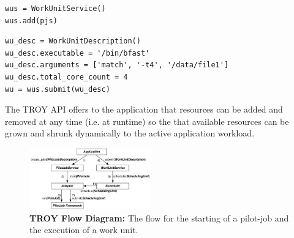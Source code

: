 \documentclass[conference,final]{IEEEtran}
\newcommand{\alnote}[1]{ {\textcolor{blue} { ***andre: #1 }}}
\newcommand{\alnote}[1]{}
\begin{document}
\noindent\begin{minipage}{0.47 \textwidth}
\begin{lstlisting}
wus = WorkUnitService()
wus.add(pjs)
\end{lstlisting}
\end{minipage}

\noindent\begin{minipage}{0.47 \textwidth}
\begin{lstlisting}
wu_desc = WorkUnitDescription()
wu_desc.executable = '/bin/bfast'
wu_desc.arguments = ['match', '-t4', '/data/file1']
wu_desc.total_core_count = 4
wu = wus.submit(wu_desc)
\end{lstlisting}
\end{minipage}

The TROY API offers to the application that resources can be added and removed at any time (i.e. at runtime)
so the that available resources can be grown and shrunk dynamically to the active application workload.






\begin{figure}[t]
	\centering
		\includegraphics[width=0.47\textwidth]{figures/troy_flow.pdf}
	\caption{\textbf{TROY Flow Diagram:} The flow for the starting of a 
	pilot-job and the execution of a work unit.
	}
	\label{fig:figures_troy_flow}
\end{figure}
\end{document}
